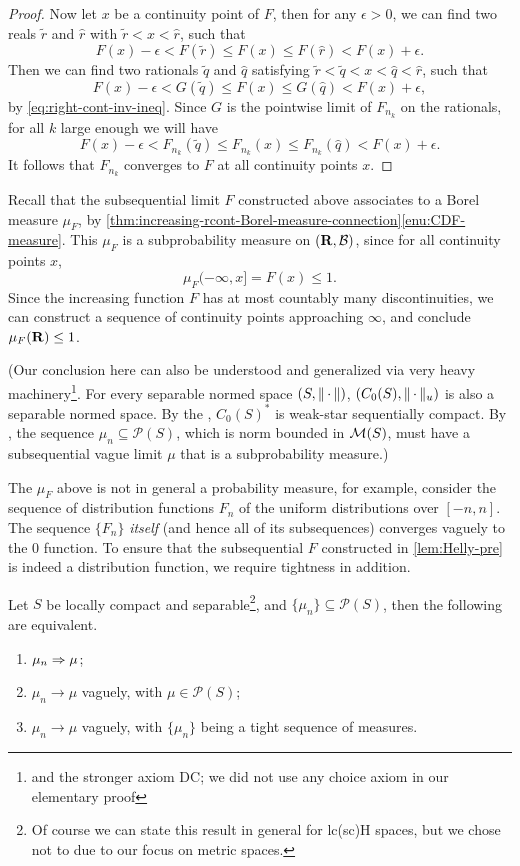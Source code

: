 \begin{proof}
    Now let $x$ be a continuity point of $F$, then for any $\epsilon > 0$, we can find two reals $\tilde r$ and $\hat r$ with $\tilde r <  x < \hat r$, such that \[
        F(x) - \epsilon < F(\tilde r) \leq F(x) \leq F(\hat r) < F(x) + \epsilon.
    \] Then we can find two rationals $\tilde q$ and $\hat q$ satisfying $\tilde r < \tilde q < x < \hat q < \hat r$, such that \[
        F(x) - \epsilon < G(\tilde q) \leq F(x) \leq G(\hat q) < F(x) + \epsilon,
    \] by \eqref{eq:right-cont-inv-ineq}. Since $G$ is the pointwise limit of $F_{n_k}$ on the rationals, for all $k$ large enough we will have \[
        F(x) - \epsilon < F_{n_k}(\tilde q) \leq F_{n_k}(x) \leq F_{n_k}(\hat q) < F(x) + \epsilon.
    \] It follows that $F_{n_k}$ converges to $F$ at all continuity points $x$.
\end{proof}

Recall that the subsequential limit $F$ constructed above associates to a Borel measure $\mu_F$, by \cref{thm:increasing-rcont-Borel-measure-connection}\ref{enu:CDF-measure}. This $\mu_F$ is a subprobability measure on $(\mathbf{R},\mathcal{B})$, since for all continuity points $x$, \[\mu_F(-\infty,x] = F(x)\leq 1.\] Since the increasing function $F$ has at most countably many discontinuities, we can construct a sequence of continuity points approaching $\infty$, and conclude $\mu_F(\mathbf{R})\leq 1$.

(Our conclusion here can also be understood and generalized via very heavy machinery\footnote{and the stronger axiom \textsf{DC}; we did not use any choice axiom in our elementary proof}. For every separable normed space $(S,\lVert \,\cdot\, \rVert)$, $(C_0(S),\lVert \,\cdot\, \rVert_u)$ is also a separable normed space. By the , $C_0(S)^*$ is weak-star sequentially compact. By , the sequence $\mu_n \subseteq \mathcal P(S)$, which is norm bounded in $\mathcal{M}(S)$, must have a subsequential vague limit $\mu$ that is a subprobability measure.)

The $\mu_F$ above is not in general a probability measure, for example, consider the sequence of distribution functions $F_n$ of the uniform distributions over $[-n,n]$. The sequence $\{F_n\}$ \emph{itself} (and hence all of its subsequences) converges vaguely to the $0$ function. To ensure that the subsequential $F$ constructed in \cref{lem:Helly-pre} is indeed a distribution function, we require tightness in addition.

\begin{thm}
    Let $S$ be locally compact and separable\footnote{Of course we can state this result in general for lc(sc)H spaces, but we chose not to due to our focus on metric spaces.}, and $\{\mu_n\} \subseteq \mathcal P(S)$, then the following are equivalent. \begin{enumerate}
        \item $\mu_n \Rightarrow \mu$;
        \item $\mu_n \to \mu$ vaguely, with $\mu\in \mathcal P(S)$;
        \item $\mu_n \to \mu$ vaguely, with $\{\mu_n\}$ being a tight sequence of measures.
    \end{enumerate}
\end{thm}



